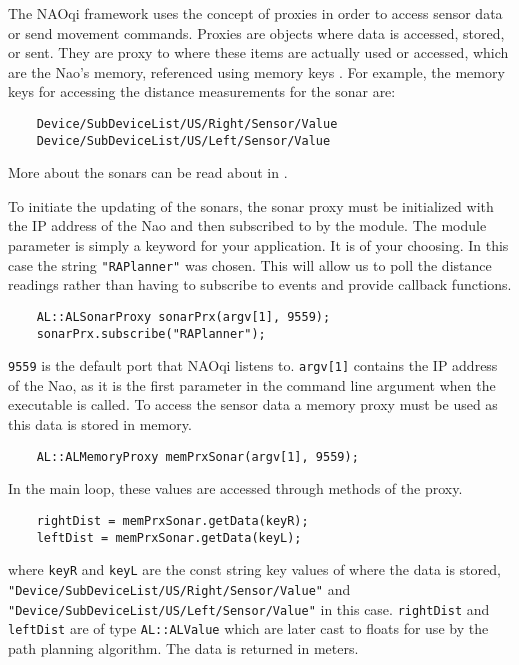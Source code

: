 The NAOqi framework uses the concept of proxies in order to access sensor data or send movement commands. Proxies are objects where data is accessed, stored, or sent. They are proxy to where these items are actually used or accessed, which are the Nao's memory, referenced using memory keys \cite{memory1}. For example, the memory keys for accessing the distance measurements for the sonar are:
\lstset{language=C++}
\begin{lstlisting}
	Device/SubDeviceList/US/Right/Sensor/Value
	Device/SubDeviceList/US/Left/Sensor/Value
\end{lstlisting}

More about the sonars can be read about in \cite{sonar_ref1}.

To initiate the updating of the sonars, the sonar proxy must be initialized with the IP address of the Nao and then subscribed to by the module. The module parameter is simply a keyword for your application. It is of your choosing. In this case the string \lstinline$"RAPlanner"$ was chosen. This will allow us to poll the distance readings rather than having to subscribe to events and provide callback functions.\cite{sonar_ref2}\cite{sonar_ref3}

\begin{lstlisting}
	AL::ALSonarProxy sonarPrx(argv[1], 9559);
	sonarPrx.subscribe("RAPlanner");
\end{lstlisting}
\lstinline$9559$ is the default port that NAOqi listens to. \lstinline$argv[1]$ contains the IP address of the Nao, as it is the first parameter in the command line argument when the executable is called.
To access the sensor data a memory proxy must be used as this data is stored in memory.

\begin{lstlisting}
	AL::ALMemoryProxy memPrxSonar(argv[1], 9559);
\end{lstlisting}
In the main loop, these values are accessed through methods of the proxy.

\begin{lstlisting}
	rightDist = memPrxSonar.getData(keyR);
	leftDist = memPrxSonar.getData(keyL);
\end{lstlisting}
where \lstinline$keyR$ and \lstinline$keyL$ are the const string key values of where the data is stored, \lstinline$"Device/SubDeviceList/US/Right/Sensor/Value"$ and \lstinline$"Device/SubDeviceList/US/Left/Sensor/Value"$ in this case. \lstinline$rightDist$ and \lstinline$leftDist$ are of type \lstinline$AL::ALValue$ which are later cast to floats for use by the path planning algorithm. The data is returned in meters.


